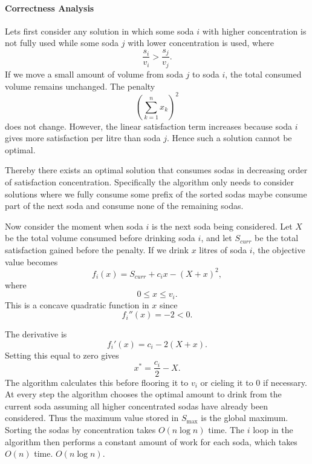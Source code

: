 \documentclass[11pt]{article}
\begin{document}
\paragraph{Correctness Analysis}

Lets first consider any solution in which some soda $i$ with higher concentration is not fully used while some soda $j$ with lower concentration is used, where
\[
\frac{s_i}{v_i} > \frac{s_j}{v_j}.
\]
If we move a small amount of volume from soda $j$ to soda $i$, the total consumed volume remains unchanged. The penalty
\[
\left(\sum_{k=1}^n x_k\right)^2
\]
does not change. However, the linear satisfaction term increases because soda $i$ gives more satisfaction per litre than soda $j$. Hence such a solution cannot be optimal.

Thereby there exists an optimal solution that consumes sodas in decreasing order of satisfaction concentration. Specifically the algorithm only needs to consider solutions where we fully consume some prefix of the sorted sodas 
maybe consume part of the next soda and consume none of the remaining sodas.

Now consider the moment when soda $i$ is the next soda being considered. Let $X$ be the total volume consumed before drinking soda $i$, and let $S_{curr}$ be the total satisfaction gained before the penalty. If we drink $x$ litres of soda $i$, the objective value becomes
\[
f_i(x) = S_{curr} + c_i x - (X+x)^2,
\]
where
\[
0 \le x \le v_i.
\]
This is a concave quadratic function in $x$ since
\[
f_i''(x) = -2 < 0.
\]

The derivative is
\[
f_i'(x) = c_i - 2(X+x).
\]
Setting this equal to zero gives
\[
x^* = \frac{c_i}{2} - X.
\]
The algorithm calculates this before flooring it to $v_i$ or cieling it to $0$ if necessary.
At every step the algorithm chooses the optimal amount to drink from the current soda assuming all higher concentrated sodas have already been considered. 
Thus the maximum value stored in $S_{\max}$ is the global 
maximum.
Sorting the sodas by concentration takes $O(n \log n)$ time. 
The $i$ loop in the algorithm then performs a constant amount of work for each soda, which takes
$
O(n)
$
time. 
$
O(n \log n).
$



\newpage 
\end{document}
